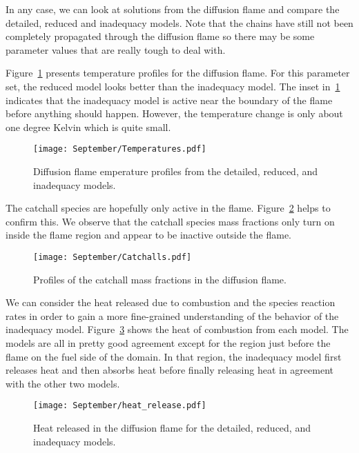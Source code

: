 In any case, we can look at solutions from the diffusion flame and compare 
the detailed, reduced and inadequacy models.  Note that the chains have 
still not been completely propagated through the diffusion flame so there 
may be some parameter values that are really tough to deal with.

Figure~\ref{fig:T_diffusion_flame} presents temperature profiles for the 
diffusion flame.  For this parameter set, the reduced model looks better 
than the inadequacy model.  The inset in~\ref{fig:T_diffusion_flame} indicates 
that the inadequacy model is active near the boundary of the flame before 
anything should happen.  However, the temperature change is only about one 
degree Kelvin which is quite small.
\begin{figure}[ht!]
  \texttt{[image: September/Temperatures.pdf]}
  \caption{Diffusion flame emperature profiles from the detailed,
           reduced, and inadequacy models.}
  \label{fig:T_diffusion_flame}
\end{figure}

The catchall species are hopefully only active in the flame. 
Figure~\ref{fig:catchall_profiles} helps to confirm this.  We observe that 
the catchall species mass fractions only turn on inside the flame region and 
appear to be inactive outside the flame.
\begin{figure}[ht!]
  \texttt{[image: September/Catchalls.pdf]}
  \caption{Profiles of the catchall mass fractions in the diffusion flame.}
  \label{fig:catchall_profiles}
\end{figure}

We can consider the heat released due to combustion and the species reaction 
rates in order to gain a more fine-grained understanding of the behavior 
of the inadequacy model.  Figure~\ref{fig:heat_release} shows the heat of 
combustion from each model.  The models are all in pretty good agreement 
except for the region just before the flame on the fuel side of the domain. 
In that region, the inadequacy model first releases heat and then absorbs 
heat before finally releasing heat in agreement with the other two models.
\begin{figure}[ht!]
  \texttt{[image: September/heat\_release.pdf]}
  \caption{Heat released in the diffusion flame for the detailed, 
           reduced, and inadequacy models.}
  \label{fig:heat_release}
\end{figure}

